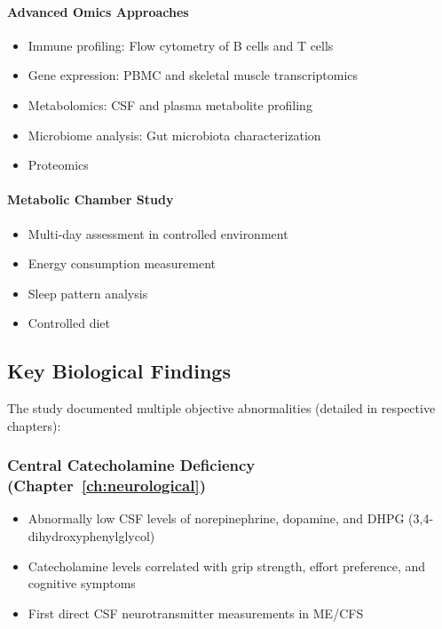 \paragraph{Advanced Omics Approaches}
\begin{itemize}
    \item Immune profiling: Flow cytometry of B cells and T cells
    \item Gene expression: PBMC and skeletal muscle transcriptomics
    \item Metabolomics: CSF and plasma metabolite profiling
    \item Microbiome analysis: Gut microbiota characterization
    \item Proteomics
\end{itemize}

\paragraph{Metabolic Chamber Study}
\begin{itemize}
    \item Multi-day assessment in controlled environment
    \item Energy consumption measurement
    \item Sleep pattern analysis
    \item Controlled diet
\end{itemize}

\subsection{Key Biological Findings}

The study documented multiple objective abnormalities (detailed in respective chapters):

\subsubsection{Central Catecholamine Deficiency (Chapter~\ref{ch:neurological})}
\begin{itemize}
    \item Abnormally low CSF levels of norepinephrine, dopamine, and DHPG (3,4-dihydroxyphenylglycol)
    \item Catecholamine levels correlated with grip strength, effort preference, and cognitive symptoms
    \item First direct CSF neurotransmitter measurements in ME/CFS
\end{itemize}

